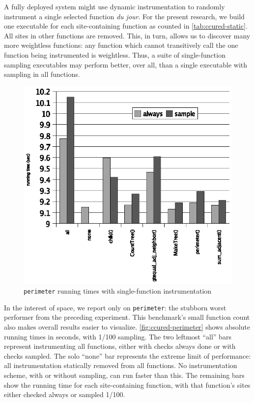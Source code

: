 A fully deployed system might use dynamic instrumentation to randomly
instrument a single selected function \textit{du jour}.  For the
present research, we build one executable for each site-containing
function as counted in \autoref{tab:ccured-static}.  All sites in
other functions are removed.  This, in turn, allows us to discover
many more weightless functions: any function which cannot transitively
call the one function being instrumented is weightless.  Thus, a suite
of single-function sampling executables may perform better, over all,
than a single executable with sampling in all functions.

\begin{figure}
  \centering
  \includegraphics[width=\columnwidth]{applications/perimeter}
  \caption{\texttt{perimeter} running times with single-function
    instrumentation}
  \label{fig:ccured-perimeter}
\end{figure}

In the interest of space, we report only on \texttt{perimeter}: the
stubborn worst performer from the preceding experiment.  This
benchmark's small function count also makes overall results easier to
visualize.  \autoref{fig:ccured-perimeter} shows absolute running
times in seconds, with 1/100 sampling.  The two leftmost ``all'' bars
represent instrumenting all functions, either with checks always done
or with checks sampled.  The solo ``none'' bar represents the extreme
limit of performance: all instrumentation statically removed from all
functions.  No instrumentation scheme, with or without sampling, can
run faster than this.  The remaining bars show the running time for
each site-containing function, with that function's sites either
checked always or sampled 1/100.

